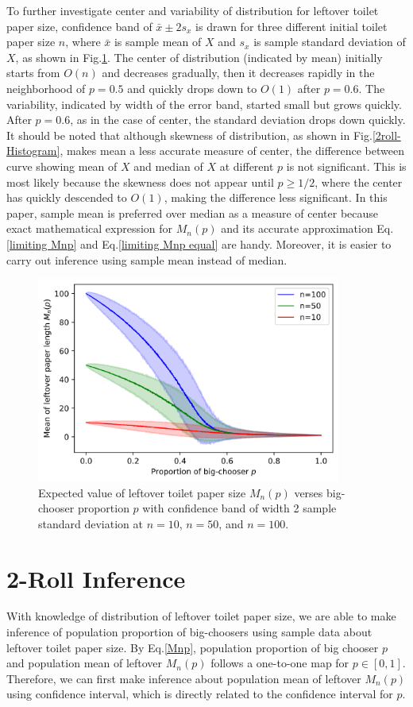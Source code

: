 \documentclass{article}
\begin{document}
To further investigate center and variability of distribution for leftover toilet paper size, confidence band of $\bar{x} \pm 2s_x$ is drawn for three different initial toilet paper size $n$, where $\bar{x}$ is sample mean of $X$ and $s_x$ is sample standard deviation of $X$, as shown in Fig.\ref{2roll-Mnp}. The center of distribution (indicated by mean) initially starts from $O(n)$ and decreases gradually, then it decreases rapidly in the neighborhood of $p=0.5$ and quickly drops down to $O(1)$ after $p=0.6$. The variability, indicated by width of the error band, started small but grows quickly. After $p=0.6$, as in the case of center, the standard deviation drops down quickly. It should be noted that although skewness of distribution, as shown in Fig.\ref{2roll-Histogram}, makes mean a less accurate measure of center, the difference between curve showing mean of $X$ and median of $X$ at different $p$ is not significant. This is most likely because the skewness does not appear until $p \geq 1/2$, where the center has quickly descended to $O(1)$, making the difference less significant. In this paper, sample mean is preferred over median as a measure of center because exact mathematical expression for $M_n(p)$ and its accurate approximation Eq.\eqref{limiting Mnp} and Eq.\eqref{limiting Mnp equal} are handy. Moreover, it is easier to carry out inference using sample mean instead of median.
\begin{figure}[ht!]
    \centering
    \includegraphics[width=10cm]{Mnp-2roll.png}
    \caption{Expected value of leftover toilet paper size $M_n(p)$ verses big-chooser proportion $p$ with confidence band of width 2 sample standard deviation at $n=10$, $n=50$, and $n=100$.}
    \label{2roll-Mnp}    
\end{figure}

\section{2-Roll Inference}
With knowledge of distribution of leftover toilet paper size, we are able to make inference of population proportion of big-choosers using sample data about leftover toilet paper size. By Eq.\eqref{Mnp}, population proportion of big chooser $p$ and population mean of leftover $M_n(p)$ follows a one-to-one map for $p \in [0,1]$. Therefore, we can first make inference about population mean of leftover $M_n(p)$ using confidence interval, which is directly related to the confidence interval for $p$. 
\end{document}
